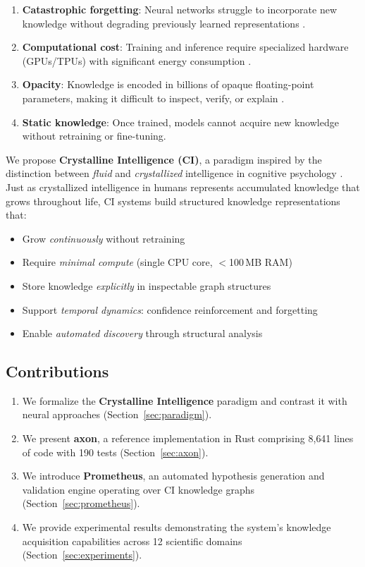 \documentclass[11pt,twocolumn]{article}
\begin{document}
\begin{enumerate}
  \item \textbf{Catastrophic forgetting}: Neural networks struggle to incorporate new knowledge without degrading previously learned representations \citep{kirkpatrick2017overcoming}.
  \item \textbf{Computational cost}: Training and inference require specialized hardware (GPUs/TPUs) with significant energy consumption \citep{strubell2019energy}.
  \item \textbf{Opacity}: Knowledge is encoded in billions of opaque floating-point parameters, making it difficult to inspect, verify, or explain \citep{lipton2018mythos}.
  \item \textbf{Static knowledge}: Once trained, models cannot acquire new knowledge without retraining or fine-tuning.
\end{enumerate}

We propose \textbf{Crystalline Intelligence (CI)}, a paradigm inspired by the distinction between \emph{fluid} and \emph{crystallized} intelligence in cognitive psychology \citep{cattell1963theory}. Just as crystallized intelligence in humans represents accumulated knowledge that grows throughout life, CI systems build structured knowledge representations that:

\begin{itemize}
  \item Grow \emph{continuously} without retraining
  \item Require \emph{minimal compute} (single CPU core, $<$100\,MB RAM)
  \item Store knowledge \emph{explicitly} in inspectable graph structures
  \item Support \emph{temporal dynamics}: confidence reinforcement and forgetting
  \item Enable \emph{automated discovery} through structural analysis
\end{itemize}

\subsection{Contributions}

\begin{enumerate}
  \item We formalize the \textbf{Crystalline Intelligence} paradigm and contrast it with neural approaches (Section~\ref{sec:paradigm}).
  \item We present \textbf{axon}, a reference implementation in Rust comprising 8{,}641 lines of code with 190 tests (Section~\ref{sec:axon}).
  \item We introduce \textbf{Prometheus}, an automated hypothesis generation and validation engine operating over CI knowledge graphs (Section~\ref{sec:prometheus}).
  \item We provide experimental results demonstrating the system's knowledge acquisition capabilities across 12 scientific domains (Section~\ref{sec:experiments}).
\end{enumerate}
\end{document}
